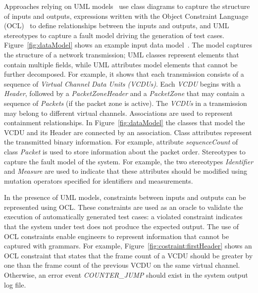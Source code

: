 Approaches relying on UML models~\cite{di2015generating,di2015evolutionary} use class diagrams to capture the structure of inputs and outputs, expressions written with the Object Constraint Language (OCL)~\cite{OCL} to define relationships between the inputs and outputs, and UML stereotypes to capture a fault model driving the generation of test cases.
Figure~\ref{fig:dataModel} shows an example input data model~\cite{di2015evolutionary}.
The model captures the structure of a network transmission; UML classes represent elements that contain multiple fields, while UML attributes model elements that cannot be further decomposed. For example, it shows that each transmission consists of a sequence of \emph{Virtual Channel Data Units (VCDUs)}. Each \emph{VCDU} begins with a \emph{Header}, followed by a \emph{PacketZoneHeader} and a \emph{PacketZone} that may contain a sequence of \emph{Packets} (if the packet zone is active).
The \emph{VCDUs} in a transmission may belong to different virtual channels.
Associations are used to represent containment relationships. In Figure~\ref{fig:dataModel} the classes that model the VCDU and its Header are connected by an association.
Class attributes represent the transmitted binary information. For example, attribute \emph{sequenceCount} of class \emph{Packet} is used to store information about the packet order.
Stereotypes to capture the fault model of the system. 
For example, 
the two stereotypes \emph{Identifier} and \emph{Measure} are used to indicate that these attributes should be modified using mutation operators specified for identifiers and measurements.


In the presence of UML models, constraints between inputs and outputs can be represented using OCL.
These constraints are used as an oracle to validate the execution of automatically generated test cases: a violated constraint indicates that the system under test does not produce the expected output. 
The use of OCL constraints enable engineers to represent information that cannot be captured with grammars.
For example, Figure~\ref{fig:costraint:firstHeader} shows an OCL constraint that states that the frame count of a VCDU should be greater by one than the frame count of the previous VCDU on the same virtual channel. Otherwise, an error event \emph{COUNTER\_JUMP} should exist in the system output log file. 

